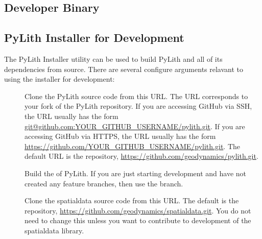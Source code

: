
\subsection{Developer Binary}


\subsection{PyLith Installer for Development}

The PyLith Installer utility can be used to build PyLith and all of
its dependencies from source. There are several configure arguments
relavant to using the installer for development:
\begin{description}
\item[] Clone the PyLith source
  code from this URL. The URL corresponds to your fork of the PyLith
  repository. If you are accessing GitHub via SSH, the URL usually has
  the form \url{git@github.com:YOUR_GITHUB_USERNAME/pylith.git}. If
  you are accessing GitHub via HTTPS, the URL usually has the form
  \url{https://github.com/YOUR_GITHUB_USERNAME/pylith.git}. The
  default URL is the  repository,
  \url{https://github.com/geodynamics/pylith.git}.
\item[] Build the
   of PyLith. If you are just starting development
  and have not created any feature branches, then use the
   branch.
\item[] Clone the
  spatialdata source code from this URL. The default is the
   repository,
  \url{https://github.com/geodynamics/spatialdata.git}. You do not
  need to change this unless you want to contribute to development of
  the spatialdata library.
\end{description}

